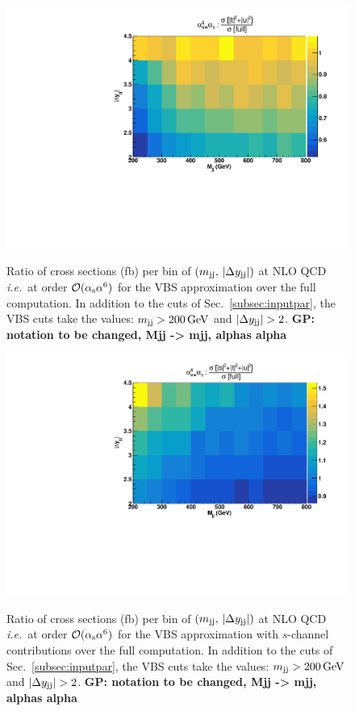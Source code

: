\begin{figure}[h]
\centering
{\includegraphics[scale=0.39]{figures/scanfigures/a6as_vbfnloVSrecola_tu.pdf}}
\caption{Ratio of cross sections (fb) per bin of $(m_{\text{j}\text{j}},\,|\Delta y_{\text{j}\text{j}}|)$ at NLO QCD \emph{i.e.}\ at order $\mathcal{O}(\alpha_\text{s}\alpha^6)$ for the VBS approximation over the full computation.
In addition to the cuts of Sec.~\ref{subsec:inputpar}, the VBS cuts take the values: $m_{\text{j}\text{j}}>200 \,\text{GeV}$ and $|\Delta y_{\Pj\Pj}|>2$.
{\bf GP: notation to be changed, Mjj -> mjj, alphas alpha} }
\label{fig:ratio2d_NLO}
\end{figure}
%
\begin{figure}[hbt]
\centering
{\includegraphics[scale=0.39]{figures/scanfigures/a6as_vbfnloVSrecola_stu.pdf}}
\caption{Ratio of cross sections (fb) per bin of $(m_{\text{j}\text{j}},\,|\Delta y_{\text{j}\text{j}}|)$ at NLO QCD \emph{i.e.}\ at order $\mathcal{O}(\alpha_\text{s}\alpha^6)$ for the VBS approximation with $s$-channel contributions over the full computation.
In addition to the cuts of Sec.~\ref{subsec:inputpar}, the VBS cuts take the values: $m_{\text{j}\text{j}}>200 \,\text{GeV}$ and $|\Delta y_{\Pj\Pj}|>2$.
{\bf GP: notation to be changed, Mjj -> mjj, alphas alpha} }
\label{fig:mjjdyjj_2d_NLO}
\end{figure}

